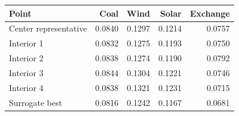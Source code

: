 \begin{tabular}{@{}lrrrr@{}}\toprule
Point & Coal & Wind & Solar & Exchange \\ \midrule
Center representative & 0.0840 & 0.1297 & 0.1214 & 0.0757 \\
Interior 1 & 0.0832 & 0.1275 & 0.1193 & 0.0750 \\
Interior 2 & 0.0838 & 0.1274 & 0.1190 & 0.0792 \\
Interior 3 & 0.0844 & 0.1304 & 0.1221 & 0.0746 \\
Interior 4 & 0.0838 & 0.1321 & 0.1231 & 0.0715 \\
Surrogate best & 0.0816 & 0.1242 & 0.1167 & 0.0681 \\
\bottomrule\end{tabular}
